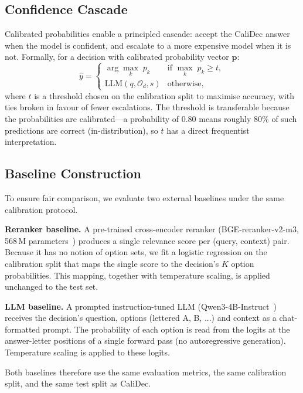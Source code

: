 \documentclass[twocolumn]{ICCKjournal}
\begin{document}
\subsection{Confidence Cascade}
\label{sec:cascade}
Calibrated probabilities enable a principled cascade: accept the CaliDec answer when the model is confident, and escalate to a more expensive model when it is not. Formally, for a decision with calibrated probability vector $\mathbf{p}$:
\begin{equation}
    \hat{y} = \begin{cases}
        \arg\max_k\; p_k & \text{if } \max_k\; p_k \ge t, \\
        \text{LLM}(q, \mathcal{O}_d, s) & \text{otherwise,}
    \end{cases}
    \label{eq:cascade}
\end{equation}
where $t$ is a threshold chosen on the calibration split to maximise accuracy, with ties broken in favour of fewer escalations. The threshold is transferable because the probabilities are calibrated---a probability of 0.80 means roughly 80\% of such predictions are correct (in-distribution), so $t$ has a direct frequentist interpretation.

\subsection{Baseline Construction}
\label{sec:baselines}
To ensure fair comparison, we evaluate two external baselines under the same calibration protocol.

\textbf{Reranker baseline.} A pre-trained cross-encoder reranker (BGE-reranker-v2-m3, 568\,M parameters~\cite{bge_m3}) produces a single relevance score per (query, context) pair. Because it has no notion of option sets, we fit a logistic regression on the calibration split that maps the single score to the decision's $K$ option probabilities. This mapping, together with temperature scaling, is applied unchanged to the test set.

\textbf{LLM baseline.} A prompted instruction-tuned LLM (Qwen3-4B-Instruct~\cite{qwen2025qwen3}) receives the decision's question, options (lettered A, B, ...) and context as a chat-formatted prompt. The probability of each option is read from the logits at the answer-letter positions of a single forward pass (no autoregressive generation). Temperature scaling is applied to these logits.

Both baselines therefore use the same evaluation metrics, the same calibration split, and the same test split as CaliDec.
\end{document}
